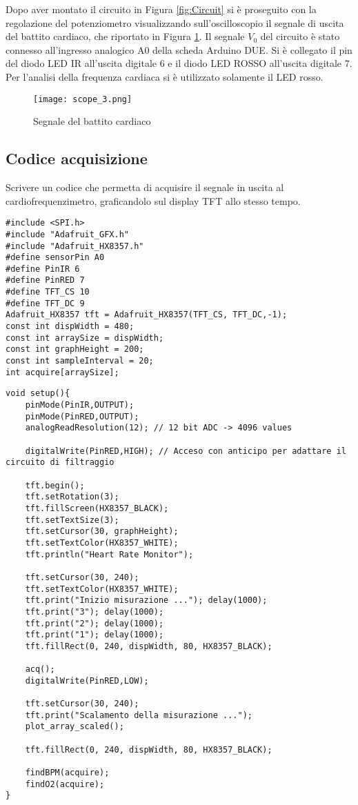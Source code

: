 Dopo aver montato il circuito in Figura \ref{fig:Circuit} si è proseguito con la regolazione del potenziometro visualizzando sull'oscilloscopio il segnale di uscita del battito cardiaco, che riportato in Figura \ref{fig:hearth-graph}. Il segnale $V_0$ del circuito è stato connesso all'ingresso analogico A0 della scheda Arduino DUE. Si è collegato il pin del diodo LED IR all'uscita digitale 6 e il diodo LED ROSSO all'uscita digitale 7. Per l'analisi della frequenza cardiaca si è utilizzato solamente il LED rosso.
\begin{figure}[H]
    \centering
    \texttt{[image: scope\_3.png]}
    \caption{Segnale del battito cardiaco}
    \label{fig:hearth-graph}
\end{figure}
\subsection{Codice acquisizione}
Scrivere un codice che permetta di acquisire il segnale in uscita al cardiofrequenzimetro, graficandolo sul display TFT allo stesso tempo.
\begin{lstlisting}[frame=single, language=Arduino]
#include <SPI.h>
#include "Adafruit_GFX.h"
#include "Adafruit_HX8357.h"
#define sensorPin A0
#define PinIR 6
#define PinRED 7
#define TFT_CS 10
#define TFT_DC 9
Adafruit_HX8357 tft = Adafruit_HX8357(TFT_CS, TFT_DC,-1); 
const int dispWidth = 480;
const int arraySize = dispWidth;
const int graphHeight = 200;
const int sampleInterval = 20;
int acquire[arraySize];
\end{lstlisting}
\clearpage
\begin{lstlisting}[frame=single, language=Arduino]
void setup(){
    pinMode(PinIR,OUTPUT);
    pinMode(PinRED,OUTPUT);
    analogReadResolution(12); // 12 bit ADC -> 4096 values

    digitalWrite(PinRED,HIGH); // Acceso con anticipo per adattare il circuito di filtraggio
    
    tft.begin();
    tft.setRotation(3);
    tft.fillScreen(HX8357_BLACK);
    tft.setTextSize(3);
    tft.setCursor(30, graphHeight);
    tft.setTextColor(HX8357_WHITE);
    tft.println("Heart Rate Monitor");

    tft.setCursor(30, 240);
    tft.setTextColor(HX8357_WHITE);
    tft.print("Inizio misurazione ..."); delay(1000);    
    tft.print("3"); delay(1000);   
    tft.print("2"); delay(1000);    
    tft.print("1"); delay(1000);
    tft.fillRect(0, 240, dispWidth, 80, HX8357_BLACK);

    acq();
    digitalWrite(PinRED,LOW);

    tft.setCursor(30, 240);
    tft.print("Scalamento della misurazione ...");
    plot_array_scaled();
    
    tft.fillRect(0, 240, dispWidth, 80, HX8357_BLACK);
    
    findBPM(acquire);
    findO2(acquire);
}
\end{lstlisting}
